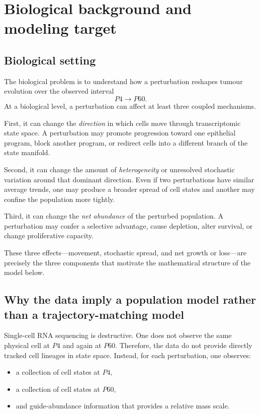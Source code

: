 \documentclass[11pt]{article}
\begin{document}
\tableofcontents

\section{Biological background and modeling target}

\subsection{Biological setting}

The biological problem is to understand how a perturbation reshapes tumour evolution over the observed interval
\[
P4 \longrightarrow P60.
\]
At a biological level, a perturbation can affect at least three coupled mechanisms.

First, it can change the \emph{direction} in which cells move through transcriptomic state space. A perturbation may promote progression toward one epithelial program, block another program, or redirect cells into a different branch of the state manifold.

Second, it can change the amount of \emph{heterogeneity} or unresolved stochastic variation around that dominant direction. Even if two perturbations have similar average trends, one may produce a broader spread of cell states and another may confine the population more tightly.

Third, it can change the \emph{net abundance} of the perturbed population. A perturbation may confer a selective advantage, cause depletion, alter survival, or change proliferative capacity.

These three effects---movement, stochastic spread, and net growth or loss---are precisely the three components that motivate the mathematical structure of the model below.

\subsection{Why the data imply a population model rather than a trajectory-matching model}

Single-cell RNA sequencing is destructive. One does not observe the same physical cell at $P4$ and again at $P60$. Therefore, the data do not provide directly tracked cell lineages in state space. Instead, for each perturbation, one observes:
\begin{itemize}[leftmargin=2em]
    \item a collection of cell states at $P4$,
    \item a collection of cell states at $P60$,
    \item and guide-abundance information that provides a relative mass scale.
\end{itemize}
\end{document}
